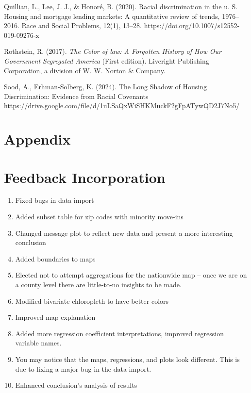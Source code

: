 \documentclass[11pt]{article}
\begin{document}
Quillian, L., Lee, J. J., \& Honoré, B. (2020). Racial discrimination in the u. S. Housing and mortgage lending markets: A quantitative review of trends, 1976–2016. Race and Social Problems, 12(1), 13–28. https://doi.org/10.1007/s12552-019-09276-x

Rothstein, R. (2017). \textit{The Color of law: A Forgotten History of How Our Government Segregated America} (First edition). Liveright Publishing Corporation, a division of W. W. Norton \& Company.

Sood, A., Erhman-Solberg, K. (2024). The Long Shadow of Housing Discrimination: Evidence from Racial Covenants https://drive.google.com/file/d/1uLSaQxWiSHKMuckF2gFpATywQD2J7No5/    

\newpage
\appendix
    \section*{Appendix}\label{appendix}

    \section{Feedback Incorporation}\label{feedback-incorporation}
    \begin{enumerate}
        \item Fixed bugs in data import 
        \item Added subset table for zip codes with minority move-ins
        \item Changed message plot to reflect new data and present a more interesting conclusion 
        \item Added boundaries to maps 
        \item Elected not to attempt aggregations for the nationwide map --
        once we are on a county level there are little-to-no insights to be
        made. 
        \item Modified bivariate chloropleth to have better colors 
        \item Improved map explanation 
        \item Added more regression coefficient interpretations,
        improved regression variable names. 
        \item You may notice that the maps,
        regressions, and plots look different. This is due to fixing a major bug
        in the data import. 
        \item Enhanced conclusion's analysis of results
    \end{enumerate}


    
    
    
\end{document}
